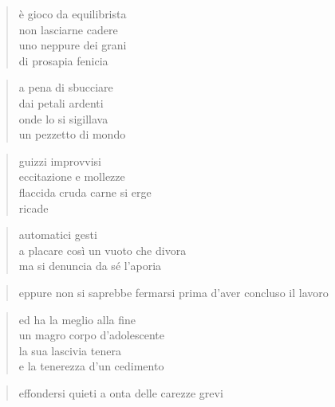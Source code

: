 \begin{poem}
\begin{poem}
	\begin{verse}
		è gioco da equilibrista\\
		non lasciarne cadere\\
		uno neppure dei grani\\
		di prosapia fenicia
	\end{verse}

	\begin{verse}
		a pena di sbucciare\\
		dai petali ardenti\\
		onde lo si sigillava\\
		un pezzetto di mondo
	\end{verse}

\clearpage


	\begin{verse}
                guizzi improvvisi\\
                eccitazione e mollezze\\
                flaccida cruda carne si erge\\
                ricade
	\end{verse}

	\begin{verse}
                automatici gesti\\
                a placare così un vuoto che divora\\
                ma si denuncia da sé l’aporia
	\end{verse}

	\begin{verse}
                eppure non si saprebbe fermarsi prima d’aver concluso il lavoro
	\end{verse}

	\begin{verse}
                ed ha la meglio alla fine\\
                un magro corpo d’adolescente\\
                la sua lascivia tenera\\
                e la tenerezza d’un cedimento
	\end{verse}

	\begin{verse}
                effondersi quieti a onta delle carezze grevi
	\end{verse}

\clearpage



\end{poem}
\end{poem}
